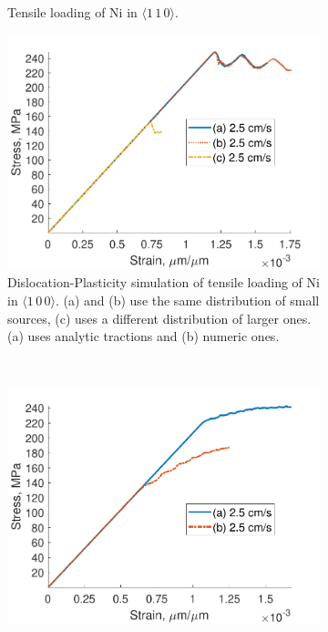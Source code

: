 \begin{figure}
\begin{subfigure}[t]{0.45\linewidth}
        \caption[Tensile loading of Ni in $\langle 1\, 1\, 0 \rangle$.]{Tensile loading of Ni in $\langle 1\, 1\, 0 \rangle$.}
        \label{sf:Ni110}
    \end{subfigure}

    \begin{subfigure}[t]{0.45\linewidth}
        \centering
        \includegraphics[width=\linewidth]{../data/Ni100_DDD.pdf}
        \caption[Dislocation-Plasticity simulation of tensile loading of Ni in $\langle 1\, 0\, 0 \rangle$.]{Dislocation-Plasticity simulation of tensile loading of Ni in $\langle 1\, 0\, 0 \rangle$. (a) and (b) use the same distribution of small sources, (c) uses a different distribution of larger ones. (a) uses analytic tractions and (b) numeric ones.}
        \label{sf:Ni100_DDD}
    \end{subfigure}
    ~
    \begin{subfigure}[t]{0.45\linewidth}
        \centering
        \includegraphics[width=\linewidth]{../data/Ni110_DDD.pdf}

\end{subfigure}
\end{figure}
